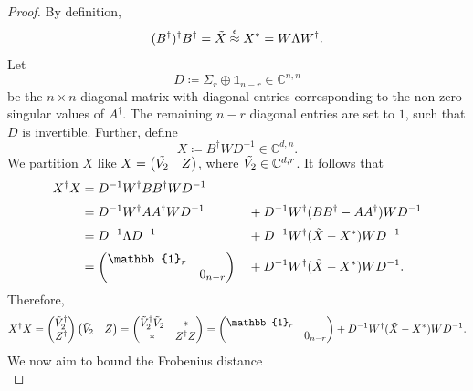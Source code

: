 \begin{proof}
By definition,
\begin{equation*}
(B^{\dag})^{\dag}B^{\dag}=\Tilde{X}\stackrel{\epsilon}{\approx}X^*=W\Lambda W^{\dag}.
\end{equation*}
Let 
\begin{equation*}
D\coloneqq\Sigma_r\oplus\mathbb{1}_{n-r}\in\mathbb{C}^{n,n}
\end{equation*} be the $n\times n$ diagonal matrix with diagonal entries corresponding to the non-zero singular values of $A^{\dag}$. The remaining $n-r$ diagonal entries are set to $1$, such that $D$ is invertible. Further, define
\begin{equation*}
X\coloneqq B^{\dag} W D^{-1}\in\mathbb{C}^{d,n}.
\end{equation*}
We partition $X$ like $X=
\begin{pmatrix}
\Tilde{V_2} &  Z
\end{pmatrix}$, where $\Tilde{V_2}\in\mathbb{C}^{d,r}$.
It follows that
\begin{alignat*}{2}
X^{\dag}X & = D^{-1}W^{\dag}BB^{\dag}WD^{-1} && \\[0.2em]
& = D^{-1}W^{\dag}AA^{\dag}WD^{-1} && +D^{-1}W^{\dag}(BB^{\dag}-AA^{\dag})WD^{-1} \\[0.2em]
& = D^{-1}\Lambda D^{-1} && + D^{-1}W^{\dag}(\Tilde{X}-X^*)WD^{-1} \\[0.2em]
& =
\begin{pmatrix}
\mathbb{1}_r & \\
& 0_{n-r}
\end{pmatrix} && + D^{-1}W^{\dag}(\Tilde{X}-X^*)WD^{-1}.
\end{alignat*}
Therefore,
\begin{equation*}
X^{\dag}X=
\begin{pmatrix}
\Tilde{V}_2^{\dag}\\
Z^{\dag}
\end{pmatrix}
\begin{pmatrix}
\Tilde{V}_2 & Z
\end{pmatrix} =
\begin{pmatrix}
\Tilde{V}_2^{\dag}\Tilde{V}_2 & * \\
* & Z^{\dag}Z
\end{pmatrix}
= 
\begin{pmatrix}
\mathbb{1}_r & \\
& 0_{n-r}
\end{pmatrix} + D^{-1}W^{\dag}(\Tilde{X}-X^*)WD^{-1}.
\end{equation*}
We now aim to bound the Frobenius distance
\begin{equation*}

\end{equation*}
\end{proof}
